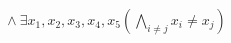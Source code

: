 \documentclass[preview]{standalone}
\begin{document}
\begin{align*}
\land \ \exists x_1, x_2, x_3, x_4, x_5 \left(\bigwedge_{i \neq j} x_i \neq x_j\right)
\end{align*}
\end{document}
